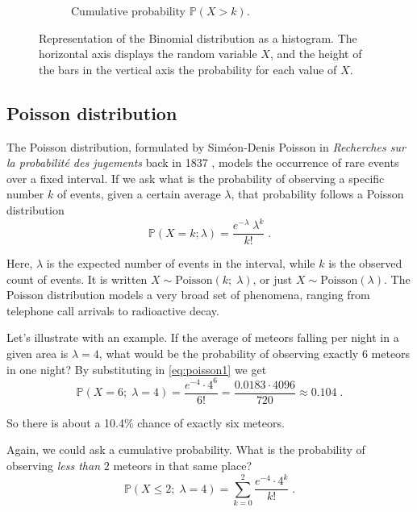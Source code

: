 \documentclass{book}
\begin{document}
\begin{figure}[ht]
\begin{subfigure}[b]{0.48\textwidth}
        \caption{Cumulative probability $\mathbb{P} (X > k)$.}
        \label{fig:binomial1_cum}
    \end{subfigure}
    \caption{Representation of the Binomial distribution as a histogram. The horizontal axis displays the random variable $X$, and the height of the bars in the vertical axis the probability for each value of $X$.}
    \label{fig:binomial_comparison}
\end{figure}

\subsection*{Poisson distribution}

The Poisson distribution, formulated by Siméon-Denis Poisson in \textit{Recherches sur la probabilité des jugements} back in 1837 \cite{poisson-judgements}, models the occurrence of rare events over a fixed interval. If we ask what is the probability of observing a specific number $k$ of events, given a certain average $\lambda$, that probability follows a Poisson distribution 
\begin{equation}
	\mathbb{P}(X = k; \lambda) = \frac{e^{-\lambda} \; \lambda^k}{k!} \; .
	\label{eq:poisson1}
\end{equation}

Here, $\lambda$ is the expected number of events in the interval, while $k$ is the observed count of events. It is written $X \sim \text{Poisson}(k; \; \lambda)$, or just $X \sim \text{Poisson}(\lambda)$. The Poisson distribution models a very broad set of phenomena, ranging from telephone call arrivals to radioactive decay.

\medskip

Let's illustrate with an example. If the average of meteors falling per night in a given area is $\lambda = 4$, what would be the probability of observing exactly $6$ meteors in one night? By substituting in \eqref{eq:poisson1} we get
\begin{equation}
	\mathbb{P}(X = 6; \; \lambda = 4) = \frac{e^{-4} \cdot 4^6}{6!} = \frac{0.0183 \cdot 4096}{720} \approx 0.104 \; . \nonumber
\end{equation}

So there is about a 10.4\% chance of exactly six meteors.

\medskip

Again, we could ask a cumulative probability. What is the probability of observing \textit{less than} $2$ meteors in that same place?
\begin{equation}
	\mathbb{P}(X \leq 2; \; \lambda = 4) = \sum_{k=0}^2 \frac{e^{-4} \cdot 4^k}{k!} \; .
\end{equation}
\end{document}
